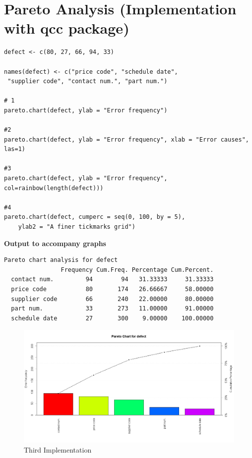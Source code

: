 \documentclass[a4paper,12pt]{article}
\begin{document}
\section{Pareto Analysis (Implementation with qcc package)}
\begin{framed}
\begin{verbatim}
defect <- c(80, 27, 66, 94, 33)

names(defect) <- c("price code", "schedule date", 
 "supplier code", "contact num.", "part num.")

# 1
pareto.chart(defect, ylab = "Error frequency")

#2
pareto.chart(defect, ylab = "Error frequency", xlab = "Error causes", las=1)

#3
pareto.chart(defect, ylab = "Error frequency", col=rainbow(length(defect)))

#4
pareto.chart(defect, cumperc = seq(0, 100, by = 5), 
    ylab2 = "A finer tickmarks grid")

\end{verbatim}
\end{framed}
\textbf{Output to accompany graphs}
\begin{verbatim}
Pareto chart analysis for defect
                Frequency Cum.Freq. Percentage Cum.Percent.
  contact num.         94        94   31.33333     31.33333
  price code           80       174   26.66667     58.00000
  supplier code        66       240   22.00000     80.00000
  part num.            33       273   11.00000     91.00000
  schedule date        27       300    9.00000    100.00000
\end{verbatim}
\newpage

\begin{figure}[h!]
\centering
\includegraphics[width=0.8\linewidth]{./Pareto3}
\caption{Third Implementation}
\label{fig:Pareto3}
\end{figure}
\end{document}
